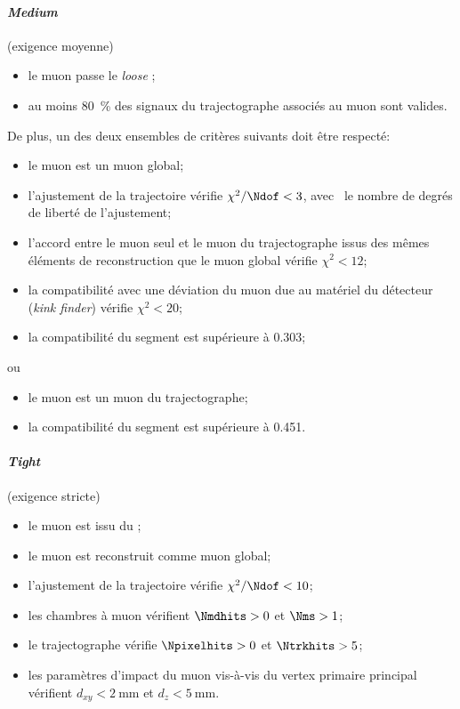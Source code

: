 \paragraph{\emph{Medium} \muonID} (exigence moyenne)
\begin{itemize}
\item le muon passe le \emph{loose} \muonID;
\item au moins \SI{80}{\%} des signaux du trajectographe associés au muon sont valides.
\end{itemize}
De plus, un des deux ensembles de critères suivants doit être respecté:
\begin{itemize}
\item le muon est un muon global;
\item l'ajustement de la trajectoire vérifie $\chi^2/\Ndof<3$, avec \Ndof\ le nombre de degrés de liberté de l'ajustement;
\item l'accord entre le muon seul et le muon du trajectographe issus des mêmes éléments de reconstruction que le muon global vérifie $\chi^2<12$;
\item la compatibilité avec une déviation du muon due au matériel du détecteur (\emph{kink finder}) vérifie $\chi^2<20$;
\item la compatibilité du segment est supérieure à \num{0.303};
\end{itemize}
ou
\begin{itemize}
\item le muon est un muon du trajectographe;
\item la compatibilité du segment est supérieure à \num{0.451}.
\end{itemize}
\paragraph{\emph{Tight} \muonID} (exigence stricte)
\begin{itemize}
\item le muon est issu du \PF;
\item le muon est reconstruit comme muon global;
\item l'ajustement de la trajectoire vérifie $\chi^2/\Ndof<10$;
\item les chambres à muon vérifient $\Nmdhits>0$ et $\Nms>1$;
\item le trajectographe vérifie $\Npixelhits>0$ et $\Ntrkhits>5$;
\item les paramètres d'impact du muon vis-à-vis du vertex primaire principal vérifient $d_{xy} < \SI{2}{\milli\meter}$ et $d_z<\SI{5}{\milli\meter}$.
\end{itemize}

